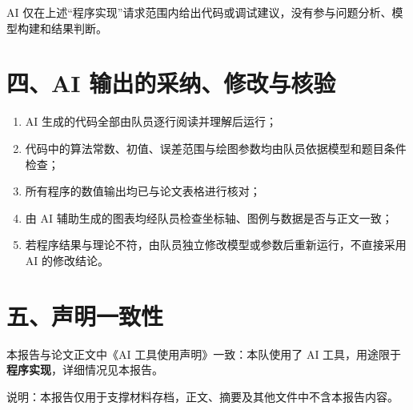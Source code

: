 \documentclass[12pt,a4paper]{ctexart}
\begin{document}
AI 仅在上述“程序实现”请求范围内给出代码或调试建议，没有参与问题分析、模型构建和结果判断。

\section*{四、AI 输出的采纳、修改与核验}

\begin{enumerate}
  \item AI 生成的代码全部由队员逐行阅读并理解后运行；
  \item 代码中的算法常数、初值、误差范围与绘图参数均由队员依据模型和题目条件检查；
  \item 所有程序的数值输出均已与论文表格进行核对；
  \item 由 AI 辅助生成的图表均经队员检查坐标轴、图例与数据是否与正文一致；
  \item 若程序结果与理论不符，由队员独立修改模型或参数后重新运行，不直接采用 AI 的修改结论。
\end{enumerate}

\section*{五、声明一致性}

本报告与论文正文中《AI 工具使用声明》一致：本队使用了 AI 工具，用途限于\textbf{程序实现}，详细情况见本报告。

\vfill
\noindent 说明：本报告仅用于支撑材料存档，正文、摘要及其他文件中不含本报告内容。
\end{document}

